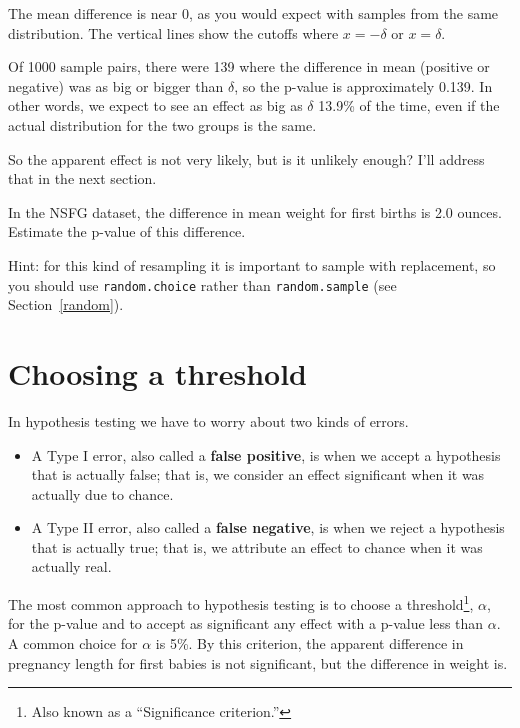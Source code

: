 \documentclass[12pt]{book}
\begin{document}
The mean difference is near 0, as you would expect with samples
from the same distribution.  The vertical lines show the cutoffs where
$x=-\delta$ or $x=\delta$.

Of 1000 sample pairs, there were 139 where the difference in mean
(positive or negative) was as big or bigger than $\delta$, so the
p-value is approximately 0.139.  In other words, we expect to see an
effect as big as $\delta$ 13.9\% of the time, even if the actual
distribution for the two groups is the same.

So the apparent effect is not very likely, but is it unlikely enough?
I'll address that in the next section.

\begin{ex}

In the NSFG dataset, the difference in mean weight for first
births is 2.0 ounces.  Estimate the p-value of this difference.

Hint: for this kind of resampling it is important to sample
with replacement, so you should use {\tt random.choice} rather
than {\tt random.sample} (see Section~\ref{random}).

\end{ex}


\section{Choosing a threshold}
\label{threshold}

In hypothesis testing we have to worry about two kinds of errors.

\begin{itemize}

\item A Type I error, also called a {\bf false positive}, is when we
  accept a hypothesis that is actually false; that is, we consider an
  effect significant when it was actually due to chance.

\item A Type II error, also called a {\bf false negative}, is when we
  reject a hypothesis that is actually true; that is, we attribute an
  effect to chance when it was actually real.

\end{itemize}

The most common approach to hypothesis testing is to choose a
threshold\footnote{Also known as a ``Significance criterion.''},
$\alpha$, for the p-value and to accept as significant any effect with
a p-value less than $\alpha$.  A common choice for $\alpha$ is 5\%.
By this criterion, the apparent difference in pregnancy length for
first babies is not significant, but the difference in weight is.
\end{document}
